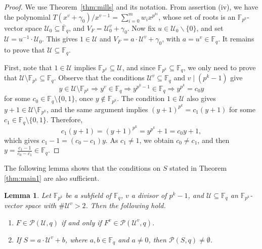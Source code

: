 \documentclass[11pt]{amsart}
\newcommand{\F}{\mathbb{F}}
\newtheorem{lemma}[theorem]{Lemma}
\theoremstyle{definition}
\theoremstyle{remark}
\begin{document}
 \begin{proof} 
 We use Theorem~\ref{thm:mills} and its notation. From assertion (iv), we have the polynomial $T(x^v+\gamma_0)/x^{v-1}=\sum_{i=0}^{m}w_ix^{p^{ki}}$, whose set of roots is an $\F_{p^k}$-vector space $\mathcal U_0\subseteq \overline{\F}_q$, and $V_F=\mathcal U_0^v+\gamma_0$. Now fix $u\in \mathcal U_0\backslash \{0\}$, and set $\mathcal U=u^{-1}\cdot \mathcal U_0$. This gives $1\in \mathcal U$ and $V_F=a\cdot \mathcal U^v+\gamma_0$, with $a=u^{v}\in \F_q$. It remains to prove that $\mathcal U\subseteq \F_q$.

First, note that $1\in \mathcal U$ implies $\F_{p^k}\subseteq \mathcal U$, and since $\F_{p^k}\subseteq \F_q$, we only need to prove that $\mathcal U\setminus \F_{p^k}\subseteq \F_q$. Observe that the conditions $\mathcal U^v \subseteq \F_q$ and $v\mid (p^k-1)$ give
$$y\in  \mathcal U\setminus \F_{p^k}\Longrightarrow y^v\in \F_q \Longrightarrow y^{p^k-1}\in \F_q   \Longrightarrow   y^{p^k}=c_0y$$
 for some $c_0\in \F_q\setminus \{0, 1\}$, once $y\not\in \F_{p^k}$. The condition  $1\in \mathcal U$ also gives  $y+1\in \mathcal U\setminus \F_{p^k}$, and the same argument implies $(y+1)^{p^k}=c_1(y+1)$ for some $c_1\in \F_q\setminus \{0, 1\}$. Therefore,
$$c_1(y+1)=(y+1)^{p^k}=y^{p^k}+1=c_0y+1,$$
which gives $c_1-1=(c_0-c_1)y$. As $c_1\ne 1$, we obtain $c_0\ne c_1$,  and then $y=\frac{c_1-1}{c_0-c_1}\in \F_q$.
\end{proof}





The following lemma shows that the conditions on $S$ stated in Theorem \ref{thm:main1} are also sufficient.








\begin{lemma}\label{lem:aux}
Let $\F_{p^k}$ be a subfield of $ \F_q$, $v$ a divisor of $p^k-1$, and $\mathcal U\subseteq \F_q$ an $\F_{p^k}$-vector space with $\#\mathcal U^v>2$. Then the following hold.
\begin{enumerate}[\rm(i)]
\item $F\in\mathcal P(\mathcal U, q)$ if and only if $F^v\in\mathcal P(\mathcal U^v, q)$.
\item If $S=a\cdot\mathcal U^{v}+b$, where $a, b\in \F_q$ and $a\neq 0$, then $\mathcal P(S, q) \neq \emptyset$.
\end{enumerate}
\end{lemma}
\end{document}
